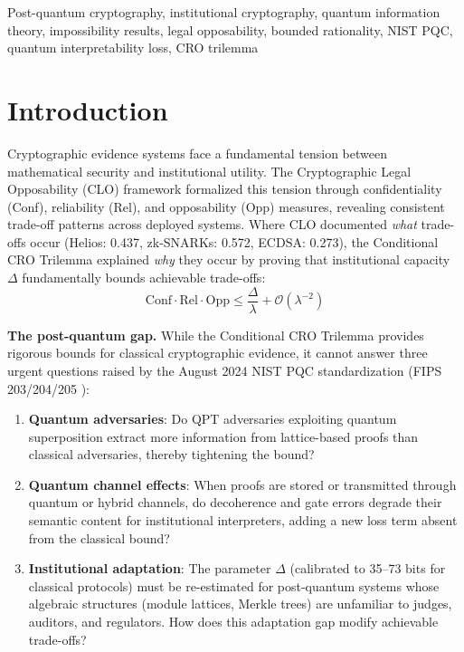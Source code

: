 \documentclass{ieeeaccess}
\begin{document}
\begin{keywords}
Post-quantum cryptography, institutional cryptography, quantum information theory, impossibility results, legal opposability, bounded rationality, NIST PQC, quantum interpretability loss, CRO trilemma
\end{keywords}

\titlepgskip=-15pt
\maketitle

\section{Introduction}\label{sec:introduction}

Cryptographic evidence systems face a fundamental tension between mathematical security and institutional utility. The Cryptographic Legal Opposability (CLO) framework \cite{Minka2026CLO} formalized this tension through confidentiality (Conf), reliability (Rel), and opposability (Opp) measures, revealing consistent trade-off patterns across deployed systems. Where CLO documented \textit{what} trade-offs occur (Helios: 0.437, zk-SNARKs: 0.572, ECDSA: 0.273), the Conditional CRO Trilemma \cite{Minka2026CRO} explained \textit{why} they occur by proving that institutional capacity $\Delta$ fundamentally bounds achievable trade-offs:
\[
\text{Conf} \cdot \text{Rel} \cdot \text{Opp} \leq 
\frac{\Delta}{\lambda} + \mathcal{O}(\lambda^{-2})
\]

\textbf{The post-quantum gap.} While the Conditional CRO Trilemma 
provides rigorous bounds for classical cryptographic evidence, it 
cannot answer three urgent questions raised by the August 2024 NIST 
PQC standardization (FIPS 203/204/205 \cite{FIPS203,FIPS204,FIPS205}):
\begin{enumerate}
    \item \textbf{Quantum adversaries}: Do QPT adversaries exploiting 
    quantum superposition extract more information from lattice-based 
    proofs than classical adversaries, thereby tightening the bound?
    \item \textbf{Quantum channel effects}: When proofs are stored or 
    transmitted through quantum or hybrid channels, do decoherence and 
    gate errors degrade their semantic content for institutional 
    interpreters, adding a new loss term absent from the classical bound?
    \item \textbf{Institutional adaptation}: The parameter $\Delta$ 
    (calibrated to 35--73 bits for classical protocols) must be 
    re-estimated for post-quantum systems whose algebraic structures 
    (module lattices, Merkle trees) are unfamiliar to judges, auditors, 
    and regulators. How does this adaptation gap modify achievable 
    trade-offs?
\end{enumerate}
\end{document}
